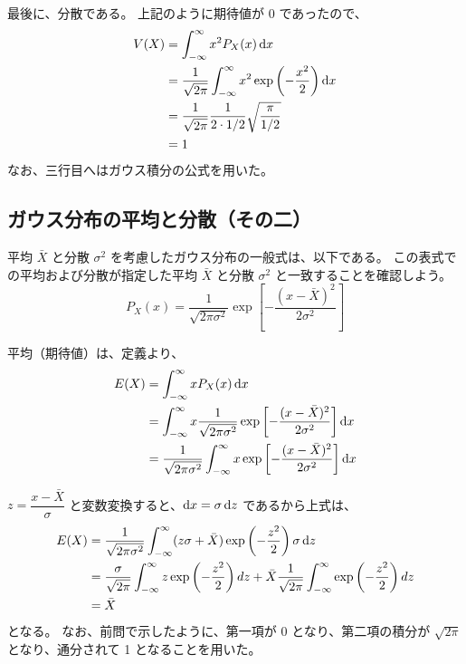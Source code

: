 \documentclass[a4paper,11pt]{ltjsarticle}
\begin{document}
\begin{appendix}
最後に、分散である。
上記のように期待値が 0 であったので、
\begin{align}
V(X) &= \int_{-\infty}^{\infty} x^2 P_X(x) \odif{x} \notag \\
	&= \frac{1}{\sqrt{2 \pi}} \int_{-\infty}^{\infty} x^2 \exp \left(- \frac{x^2}{2} \right) \odif{x} \notag \\
	&= \frac{1}{\sqrt{2 \pi}} \frac{1}{2\cdot 1/2} \sqrt{\frac{\pi}{1/2}} \notag \\
	&=1
\end{align}
なお、三行目へはガウス積分の公式を用いた。

\subsection{ガウス分布の平均と分散（その二）}

平均 $ \bar{X}$ と分散 $\sigma^2$ を考慮したガウス分布の一般式は、以下である。
この表式での平均および分散が指定した平均 $ \bar{X}$ と分散 $\sigma^2$ と一致することを確認しよう。
\begin{equation}
P_X(x) = \frac{1}{\sqrt{2 \pi \sigma^2}} \exp \left[- \frac{(x -\bar{X})^2}{2 \sigma^2} \right]
\end{equation}


平均（期待値）は、定義より、
\begin{align}
E(X) &= \int_{-\infty}^{\infty} x P_X(x) \odif{x} \notag \\
	&= \int_{-\infty}^{\infty} x \frac{1}{\sqrt{2 \pi \sigma^2}} \exp \left[- \frac{(x -\bar{X})^2}{2 \sigma^2} \right] \odif{x} \notag \\
	&= \frac{1}{\sqrt{2 \pi \sigma^2}}  \int_{-\infty}^{\infty} x \exp \left[- \frac{(x -\bar{X})^2}{2 \sigma^2} \right] \odif{x}
\end{align}

$z=\dfrac{x -\bar{X}}{\sigma}$ と変数変換すると、$\odif{x}=\sigma \odif{z}$ であるから上式は、
\begin{align}
E(X) 
	&= \frac{1}{\sqrt{2 \pi \sigma^2}}  \int_{-\infty}^{\infty} (z\sigma + \bar{X}) \exp \left(- \frac{z^2}{2} \right) \sigma \odif{z} \notag \\
	&= \frac{\sigma}{\sqrt{2 \pi}}  \int_{-\infty}^{\infty} z \exp \left(- \frac{z^2}{2} \right) dz + \bar{X} \frac{1}{\sqrt{2 \pi}} \int_{-\infty}^{\infty} \exp \left(- \frac{z^2}{2} \right) dz \notag \\
	&= \bar{X}
\end{align}
となる。
なお、前問で示したように、第一項が 0  となり、第二項の積分が $\sqrt{2 \pi}$ となり、通分されて 1 となることを用いた。


\end{appendix}
\end{document}
